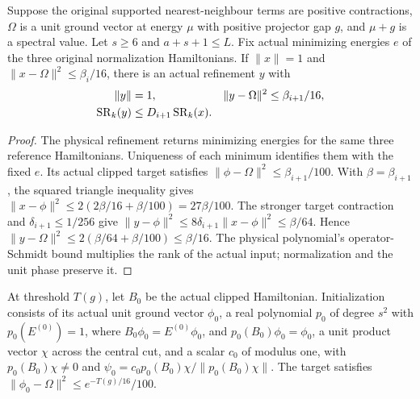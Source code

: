 \begin{lemma}
    \label{thm:aklv_dyadic_refinement}
    \leanok
    Suppose the original supported nearest-neighbour terms are positive
    contractions, $\Omega$ is a unit ground vector at energy $\mu$ with
    positive projector gap $g$, and $\mu+g$ is a spectral value.
    Let $s\ge6$ and $a+s+1\le L$. Fix actual minimizing energies $e$ of
    the three original normalization Hamiltonians.
    If $\|x\|=1$ and $\|x-\Omega\|^2\le\beta_i/16$, there is an actual
    refinement $y$ with
    \begin{align*}
        \|y\|                  & =1,                                & \|y-\Omega\|^2 & \le\beta_{i+1}/16,\notag \\
        \operatorname{SR}_k(y) & \le D_{i+1}\operatorname{SR}_k(x).
    \end{align*}
\end{lemma}
\begin{proof}
    \leanok
    The physical refinement returns minimizing energies for the same three
    reference Hamiltonians. Uniqueness of each minimum identifies them with
    the fixed $e$. Its actual clipped target satisfies
    $\|\phi-\Omega\|^2\le\beta_{i+1}/100$.
    With $\beta=\beta_{i+1}$, the squared triangle inequality gives
    $\|x-\phi\|^2\le2(2\beta/16+\beta/100)=27\beta/100$.
    The stronger target contraction and $\delta_{i+1}\le1/256$ give
    $\|y-\phi\|^2\le8\delta_{i+1}\|x-\phi\|^2\le\beta/64$.
    Hence $\|y-\Omega\|^2\le2(\beta/64+\beta/100)\le\beta/16$.
    The physical polynomial's operator-Schmidt bound multiplies the rank
    of the actual input; normalization and the unit phase preserve it.
\end{proof}

\begin{definition}
    \label{def:aklv_sequence_initialization}
    \leanok
    At threshold $T(g)$, let $B_0$ be the actual clipped Hamiltonian.
    Initialization consists of its actual unit ground vector $\phi_0$,
    a real polynomial $p_0$ of degree $s^2$ with $p_0(E^{(0)})=1$, where $B_0\phi_0=E^{(0)}\phi_0$, and
    $p_0(B_0)\phi_0=\phi_0$, a unit product vector $\chi$ across the
    central cut, and a scalar $c_0$ of modulus one, with
    $p_0(B_0)\chi\ne0$ and
    $\psi_0=c_0p_0(B_0)\chi/\|p_0(B_0)\chi\|$.
    The target satisfies $\|\phi_0-\Omega\|^2\le e^{-T(g)/16}/100$.
\end{definition}

